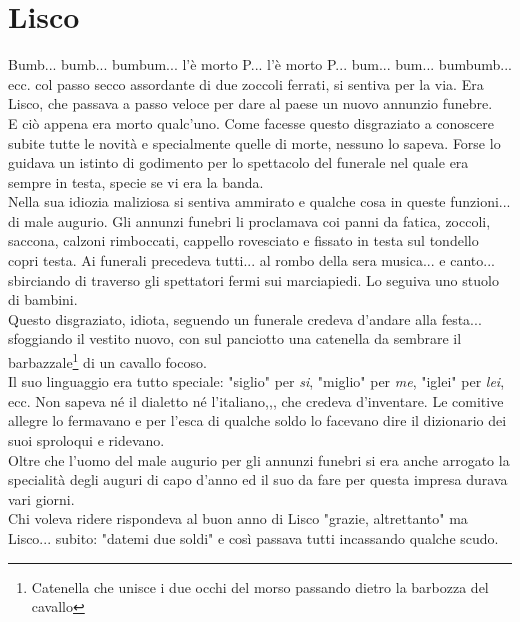 
\chapter{Lisco}
Bumb... bumb... bumbum... l'è morto P\:.\:.\:. l'è morto P\:.\:.\:. bum... bum... bumbumb... ecc. col passo secco assordante di due zoccoli ferrati, si sentiva per la via. Era Lisco, che passava a passo veloce per dare al paese un nuovo annunzio funebre.\\
E ciò appena era morto qualc'uno. Come facesse questo disgraziato a conoscere subite tutte le novità e specialmente quelle di morte, nessuno lo sapeva. Forse lo guidava un istinto di godimento per lo spettacolo del funerale nel quale era sempre in testa, specie se vi era la banda.\\
Nella sua idiozia maliziosa si sentiva ammirato e qualche cosa in queste funzioni... di male augurio. Gli annunzi funebri li proclamava coi panni da fatica, zoccoli, saccona, calzoni rimboccati, cappello rovesciato e fissato in testa sul tondello copri testa. Ai funerali precedeva tutti... al rombo della sera musica... e canto... sbirciando di traverso gli spettatori fermi sui marciapiedi. Lo seguiva uno stuolo di bambini.\\
Questo disgraziato, idiota, seguendo un funerale credeva d'andare alla festa... sfoggiando il vestito nuovo, con sul panciotto una catenella da sembrare il barbazzale\footnote{Catenella che unisce i due occhi del morso passando dietro la barbozza del cavallo} di un cavallo focoso.\\
Il suo linguaggio era tutto speciale: "siglio" per \emph{si}, "miglio" per \emph{me}, "iglei" per \emph{lei}, ecc. Non sapeva né il dialetto né l'italiano,,, che credeva d'inventare. Le comitive allegre lo fermavano e per l'esca di qualche soldo lo facevano dire il dizionario dei suoi sproloqui e ridevano.\\
Oltre che l'uomo del male augurio per gli annunzi funebri si era anche arrogato la specialità degli auguri di capo d'anno ed il suo da fare per questa impresa durava vari giorni.\\
Chi voleva ridere rispondeva al buon anno di Lisco "grazie, altrettanto" ma Lisco... subito: "datemi due soldi" e così passava tutti incassando qualche scudo.\\
